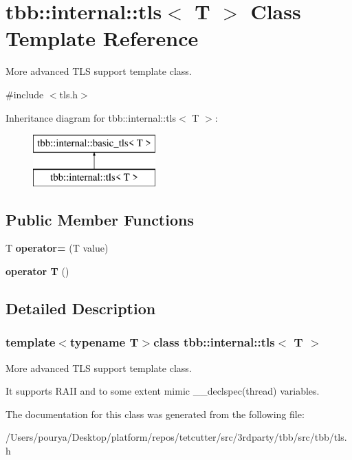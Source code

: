 \hypertarget{classtbb_1_1internal_1_1tls}{}\section{tbb\+:\+:internal\+:\+:tls$<$ T $>$ Class Template Reference}
\label{classtbb_1_1internal_1_1tls}


More advanced T\+L\+S support template class.  




{\ttfamily \#include $<$tls.\+h$>$}

Inheritance diagram for tbb\+:\+:internal\+:\+:tls$<$ T $>$\+:\begin{figure}[H]
\begin{center}
\leavevmode
\includegraphics[height=2.000000cm]{classtbb_1_1internal_1_1tls}
\end{center}
\end{figure}
\subsection*{Public Member Functions}
\begin{DoxyCompactItemize}
\item 
\hypertarget{classtbb_1_1internal_1_1tls_acf98912ee164d3cc4a48bd90546447e7}{}T {\bfseries operator=} (T value)\label{classtbb_1_1internal_1_1tls_acf98912ee164d3cc4a48bd90546447e7}

\item 
\hypertarget{classtbb_1_1internal_1_1tls_a495200159d0e85cd2039bc25b2ff7cef}{}{\bfseries operator T} ()\label{classtbb_1_1internal_1_1tls_a495200159d0e85cd2039bc25b2ff7cef}

\end{DoxyCompactItemize}


\subsection{Detailed Description}
\subsubsection*{template$<$typename T$>$class tbb\+::internal\+::tls$<$ T $>$}

More advanced T\+L\+S support template class. 

It supports R\+A\+I\+I and to some extent mimic \+\_\+\+\_\+declspec(thread) variables. 

The documentation for this class was generated from the following file\+:\begin{DoxyCompactItemize}
\item 
/\+Users/pourya/\+Desktop/platform/repos/tetcutter/src/3rdparty/tbb/src/tbb/tls.\+h\end{DoxyCompactItemize}
